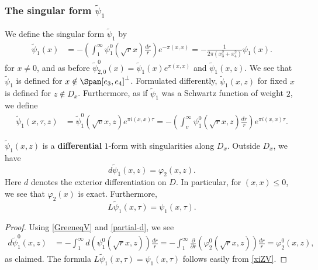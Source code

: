 \subsubsection{The singular form $\tilde{\psi}_1$}


We define the singular form $\tilde{\psi}_1$ by
\begin{align}\label{GreeneqV}
\tilde{\psi}_1(x)  &= - \left( \int_1^{\infty} \psi_1^0(\sqrt{r}x)  \frac{dr}{r} \right)e^{-\pi(x,x)} = - \frac1{2\pi(x_3^2+x_4^2)} \psi_1(x). 
\end{align}
for $x\ne 0$, and as before $\tilde{\psi}^0_{2,0}(x) = \tilde{\psi}_1(x) e^{\pi (x,x)}$ and 
$\tilde{\psi}_1(x,z)$. We see that $\tilde{\psi}_1$ is defined for
$x \notin \Span[e_3,e_4]^{\perp}$. Formulated differently,
$\tilde{\psi}_1(x,z)$ for fixed $x$ is defined for $z \notin D_x$.
Furthermore, as if $\tilde{\psi}_1$ was a Schwartz function of
weight $2$, we define
\begin{align}\label{xiZV}
\tilde{\psi}_1(x,\tau,z) &=  \tilde{\psi}_1^0(\sqrt{v}x,z) e^{\pi i (x,x)\tau}  = - \left( \int_v^{\infty} \psi_1^0(\sqrt{r}x,z) \frac{dr}{r} \right) e^{\pi i (x,x)\tau}.
\end{align}

\begin{proposition}\label{schluesselV}

$\tilde{\psi}_1(x,z)$ is a {\bf differential} $1$-form with singularities
along $D_x$. Outside $D_{x}$, we have
\[ d\tilde{\psi}_1(x,z) = \varphi_2(x,z).  \]
Here $d$ denotes the exterior differentiation on $D$. In particular,
for $(x,x)\leq 0$, we see that $\varphi_2(x)$ is exact. 
Furthermore,
\[ L\tilde{\psi}_1(x,\tau) = \psi_1(x,\tau).  \]
\end{proposition}

\begin{proof}

Using \eqref{GreeneqV} and \eqref{partial-d}, we see
\begin{align*}
d \tilde{\psi}_1^0(x,z) &= - \int_1^{\infty}d \left(\psi_1^0(\sqrt{r}x,z)\right)\frac{dr}{r}   =-\int_1^{\infty} \frac{\partial}{\partial r } \left(
\varphi_2^0(\sqrt{r}x,z)\right) \frac{dr}{r}  = \varphi_2^0(x,z),
 \end{align*}
as claimed. The formula $L\tilde{\psi}_1(x,\tau) = \psi_1(x,\tau)$
follows easily from \eqref{xiZV}.
\end{proof}




